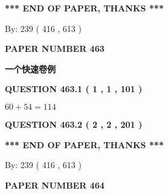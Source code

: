 \documentclass{ctexart}
\begin{document}
   
   
\vspace{1.0in} 
{\textbf{\large{ *** END OF PAPER, THANKS *** }}} 
   
   
\hspace{1.0in} By: 
 239 ( 416 ,  613 )
   
   
   
   
\newpage 
\setcounter{page}{ 
   463001 } 
   
   
   
   
 {\textbf{ \Large{ PAPER NUMBER  463  }}}
   
   
\vspace{0.2in}
   
   
   
   
   
   
 \vspace{0.2in}
{\LARGE {\textbf{ 一个快速卷例}}}
   
   
  
\vspace{0.2in}
  
{\textbf{\Large{QUESTION
463.1 
 ( 1 , 1 , 101 )
}}}
  
  
 
 

$ %
60 +  %
54=   %
114$
 
 
  
\vspace{0.2in}
  
{\textbf{\Large{QUESTION
463.2 
 ( 2 , 2 , 201 )
}}}
  
  
   
   
 \vspace{0.2in}
 
   
   
   
   
\vspace{1.0in} 
{\textbf{\large{ *** END OF PAPER, THANKS *** }}} 
   
   
\hspace{1.0in} By: 
 239 ( 416 ,  613 )
   
   
   
   
\newpage 
\setcounter{page}{ 
   464001 } 
   
   
   
   
 {\textbf{ \Large{ PAPER NUMBER  464  }}}
   
   
\vspace{0.2in}
   
\end{document}
